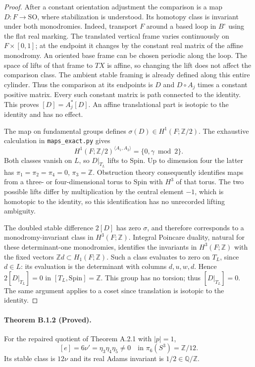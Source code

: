 \begin{proof}
After a constant orientation adjustment the comparison is
a map $D:F\to\mathrm{SO}$, where stabilization is understood.
Its homotopy class is invariant under both monodromies.
Indeed, transport $F$ around a based loop in $B^\circ$ using
the flat real marking.  The translated vertical frame varies
continuously on $F\times[0,1]$; at the endpoint it changes by
the constant real matrix of the affine monodromy.  An oriented
base frame can be chosen periodic along the loop.  The space
of lifts of that frame to $TX$ is affine, so changing the lift
does not affect the comparison class.  The ambient stable
framing is already defined along this entire cylinder.  Thus
the comparison at its endpoints is $D$ and $D\circ A_j$
times a constant positive matrix.  Every such constant
matrix is path connected to the identity.  This proves
$[D]=A_j^*[D]$.  An affine translational part is isotopic
to the identity and has no effect.

The map on fundamental groups defines
$\sigma(D)\in H^1(F;\mathbb Z/2)$.  The exhaustive calculation
in \texttt{maps\_exact.py} gives
\[
 H^1(F;\mathbb Z/2)^{\langle A_1,A_2\rangle}
      =\{0,\gamma\bmod2\}.
\]
Both classes vanish on $L$, so $D|_{T_L}$ lifts to
$\mathrm{Spin}$.  Up to dimension four the latter has
$\pi_1=\pi_2=\pi_4=0$, $\pi_3=\mathbb Z$.
Obstruction theory consequently identifies maps from a
three- or four-dimensional torus to $\mathrm{Spin}$ with
$H^3$ of that torus.  The two possible lifts differ by
multiplication by the central element $-1$, which is
homotopic to the identity, so this identification has no
unrecorded lifting ambiguity.

The doubled stable difference $2[D]$ has zero $\sigma$,
and therefore corresponds to a monodromy-invariant class
in $H^3(F;\mathbb Z)$.  Integral Poincare duality, natural
for these determinant-one monodromies, identifies the
invariants in $H^3(F;\mathbb Z)$ with the fixed vectors
$\mathbb Zd\subset H_1(F;\mathbb Z)$.  Such a class
evaluates to zero on $T_L$, since $d\in L$:
its evaluation is the determinant with columns $d,u,w,d$.
Hence $2[D|_{T_L}]=0$ in $[T_L,\mathrm{Spin}]=\mathbb Z$.
This group has no torsion; thus $[D|_{T_L}]=0$.
The same argument applies to a coset since translation is
isotopic to the identity.
\end{proof}

\paragraph{Theorem B.1.2 (Proved).}
For the repaired quotient of Theorem A.2.1 with $|p|=1$,
\[
 [e]=6\nu'=\eta_3\eta_4\eta_5\ne0
       \quad\text{in }\pi_6(S^3)=\mathbb Z/12.
 \tag{B.1.1}
\]
Its stable class is $12\nu$ and its real Adams invariant
is $1/2\in\mathbb Q/\mathbb Z$.

